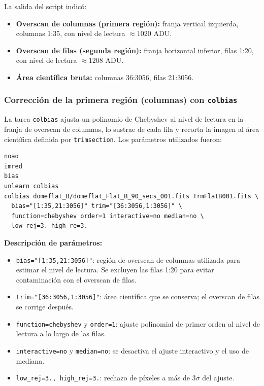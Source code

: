 \documentclass[10pt,a4paper,twocolumn]{article}
\begin{document}
\noindent La salida del script indicó:

\begin{itemize}
\item \textbf{Overscan de columnas (primera región):} franja vertical
izquierda, columnas 1:35, con nivel de lectura $\approx 1020$ ADU.
\item \textbf{Overscan de filas (segunda región):} franja horizontal
inferior, filas 1:20, con nivel de lectura $\approx 1208$ ADU.
\item \textbf{Área científica bruta:} columnas 36:3056, filas 21:3056.
\end{itemize}

\subsubsection{Corrección de la primera región (columnas) con \texttt{colbias}}

La tarea \texttt{colbias} ajusta un polinomio de Chebyshev al nivel de
lectura en la franja de overscan de columnas, lo sustrae de cada fila y
recorta la imagen al área científica definida por \texttt{trimsection}.
Los parámetros utilizados fueron:

\begin{lstlisting}
noao
imred
bias
unlearn colbias
colbias domeflat_B/domeflat_Flat_B_90_secs_001.fits TrmFlatB001.fits \
  bias="[1:35,21:3056]" trim="[36:3056,1:3056]" \
  function=chebyshev order=1 interactive=no median=no \
  low_rej=3. high_re=3.
\end{lstlisting}

\noindent\textbf{Descripción de parámetros:}
\begin{itemize}
\item \texttt{bias="[1:35,21:3056]"}: región de overscan de columnas
utilizada para estimar el nivel de lectura. Se excluyen las filas 1:20
para evitar contaminación con el overscan de filas.
\item \texttt{trim="[36:3056,1:3056]"}: área científica que se conserva;
el overscan de filas se corrige después.
\item \texttt{function=chebyshev} y \texttt{order=1}: ajuste polinomial
de primer orden al nivel de lectura a lo largo de las filas.
\item \texttt{interactive=no} y \texttt{median=no}: se desactiva el
ajuste interactivo y el uso de mediana.
\item \texttt{low\_rej=3., high\_rej=3.}: rechazo de píxeles a más de
3$\sigma$ del ajuste.
\end{itemize}
\end{document}
